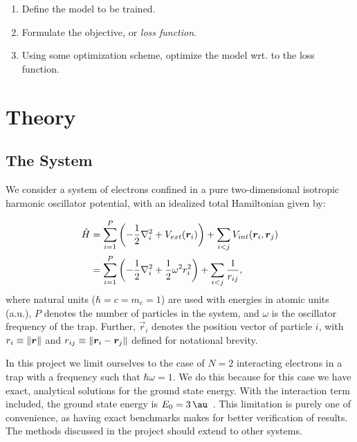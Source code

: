 \documentclass[a4paper, 11pt]{article}
\begin{document}
\begin{multicols}{2}
    \begin{enumerate}
        \item Define the model to be trained.
        \item Formulate the objective, or \emph{loss function}.
        \item Using some optimization scheme, optimize the model wrt. to the
            loss function.
    \end{enumerate}


    \section{Theory}

    \subsection{The System}

    We consider a system of electrons confined in a pure two-dimensional
    isotropic harmonic oscillator potential, with an idealized total Hamiltonian
    given by:

    \begin{align}
        \begin{split}
            \hat H &= \sum_{i=1}^P\qty(-\frac{1}{2}\laplacian_i + V_{ext}(\vec r_i)) +
            \sum_{i < j} V_{int}(\vec r_i, \vec r_j)\\
            &= \sum_{i=1}^P\qty(-\frac{1}{2}\laplacian_i + \frac{1}{2}\omega^2
            r_i^2) + \sum_{i < j} \frac{1}{r_{ij}},
        \end{split}\label{eq:H-def}
    \end{align}
    where natural units ($\hbar=c=m_e=1$) are used with energies in
    atomic units (a.u.), $P$ denotes the number of particles in the system, and
    $\omega$ is the oscillator frequency of the trap. Further, $\vec r_i$
    denotes the position vector of particle $i$, with $r_i \equiv \norm{\bm r}$ and
    $r_{ij}\equiv \norm{\bm r_i - \bm r_j}$ defined for notational brevity.

    In this project we limit ourselves to the case of $N=2$ interacting
    electrons in a trap with a frequency such that $\hbar \omega = 1$. We do
    this because for this case we have exact, analytical solutions for the
    ground state energy. With the interaction term included, the ground state
    energy is $E_0 = \SI{3}{\au}$~\cite{Taut1993}. This limitation is purely one
    of convenience, as having exact benchmarks makes for better verification of
    results. The methods discussed in the project should extend to other
    systems.


\end{multicols}
\end{document}
